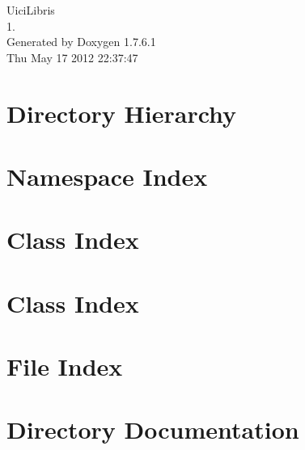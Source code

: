 \documentclass[a4paper]{book}
\begin{document}
\hypersetup{pageanchor=false,citecolor=blue}
\begin{titlepage}
\vspace*{7cm}
\begin{center}
{\Large \-Uici\-Libris \\[1ex]\large 1. }\\
\vspace*{1cm}
{\large \-Generated by Doxygen 1.7.6.1}\\
\vspace*{0.5cm}
{\small Thu May 17 2012 22:37:47}\\
\end{center}
\end{titlepage}
\clearemptydoublepage
{}
\tableofcontents
\clearemptydoublepage
{}
\hypersetup{pageanchor=true,citecolor=blue}
\chapter{\-Directory \-Hierarchy}

\chapter{\-Namespace \-Index}

\chapter{\-Class \-Index}

\chapter{\-Class \-Index}

\chapter{\-File \-Index}

\chapter{\-Directory \-Documentation}



\end{document}
